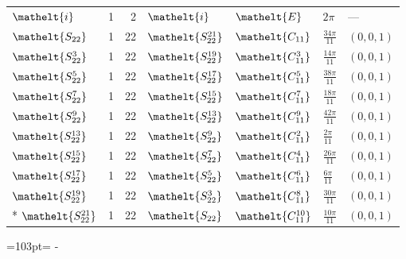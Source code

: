 \documentclass[10pt,a4paper]{article}
\newcommand{\needspace}[1]{\par\penalty-100\begingroup\dimen0=#1\relax\dimen2=\pagegoal
  \advance\dimen2-\pagetotal\ifdim\dimen0>\dimen2\relax\ifdim\dimen2>0pt\vfil\break\fi\fi
  \endgroup}
\numberwithin{equation}{section}
\newcommand{\eltfont}[1]{{\let\sigma\eltsigma\mathelt{#1}}}
\newcommand{\cls}[1]{\eltfont{#1}}
\newcommand{\dirvec}[3]{(#1, #2, #3)}
\begin{document}
{\begin{longtable}{@{}lrrllll@{}}
$\cls{i}$ & 1 & 2 & $\cls{i}$ & $\cls{E}$ & $2\pi$ & ---\\
$\cls{S_{22}}$ & 1 & 22 & $\cls{S_{22}^{21}}$ & $\cls{C_{11}}$ & $\tfrac{34\pi}{11}$ & $\dirvec{0}{0}{1}$\\
$\cls{S_{22}^{3}}$ & 1 & 22 & $\cls{S_{22}^{19}}$ & $\cls{C_{11}^{3}}$ & $\tfrac{14\pi}{11}$ & $\dirvec{0}{0}{1}$\\
$\cls{S_{22}^{5}}$ & 1 & 22 & $\cls{S_{22}^{17}}$ & $\cls{C_{11}^{5}}$ & $\tfrac{38\pi}{11}$ & $\dirvec{0}{0}{1}$\\
$\cls{S_{22}^{7}}$ & 1 & 22 & $\cls{S_{22}^{15}}$ & $\cls{C_{11}^{7}}$ & $\tfrac{18\pi}{11}$ & $\dirvec{0}{0}{1}$\\
$\cls{S_{22}^{9}}$ & 1 & 22 & $\cls{S_{22}^{13}}$ & $\cls{C_{11}^{9}}$ & $\tfrac{42\pi}{11}$ & $\dirvec{0}{0}{1}$\\
$\cls{S_{22}^{13}}$ & 1 & 22 & $\cls{S_{22}^{9}}$ & $\cls{C_{11}^{2}}$ & $\tfrac{2\pi}{11}$ & $\dirvec{0}{0}{1}$\\
$\cls{S_{22}^{15}}$ & 1 & 22 & $\cls{S_{22}^{7}}$ & $\cls{C_{11}^{4}}$ & $\tfrac{26\pi}{11}$ & $\dirvec{0}{0}{1}$\\
$\cls{S_{22}^{17}}$ & 1 & 22 & $\cls{S_{22}^{5}}$ & $\cls{C_{11}^{6}}$ & $\tfrac{6\pi}{11}$ & $\dirvec{0}{0}{1}$\\
$\cls{S_{22}^{19}}$ & 1 & 22 & $\cls{S_{22}^{3}}$ & $\cls{C_{11}^{8}}$ & $\tfrac{30\pi}{11}$ & $\dirvec{0}{0}{1}$\\*
$\cls{S_{22}^{21}}$ & 1 & 22 & $\cls{S_{22}}$ & $\cls{C_{11}^{10}}$ & $\tfrac{10\pi}{11}$ & $\dirvec{0}{0}{1}$\\
\bottomrule\end{longtable}}
\needspace{103pt}
\end{document}
